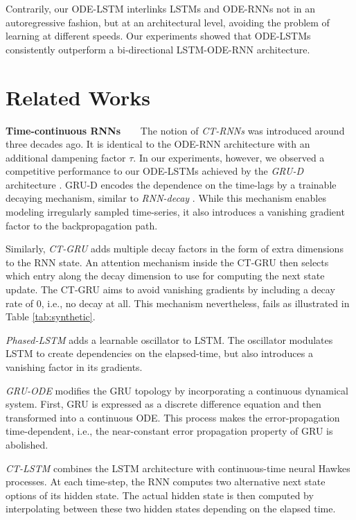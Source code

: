 \documentclass{article}
\begin{document}
Contrarily, our ODE-LSTM interlinks LSTMs and ODE-RNNs not in an autoregressive fashion, but at an architectural level, avoiding the problem of learning at different speeds. Our experiments showed that ODE-LSTMs consistently outperform a bi-directional LSTM-ODE-RNN architecture.

\section{Related Works}
\textbf{Time-continuous RNNs~~~} The notion of \textit{CT-RNNs} \cite{funahashi1993approximation} was introduced around three decades ago. It is identical to the ODE-RNN architecture \cite{rubanova2019latent} with an additional dampening factor $\tau$. In our experiments, however, we observed a competitive performance to our ODE-LSTMs achieved by the \textit{GRU-D} architecture \cite{che2018recurrent}. GRU-D encodes the dependence on the time-lags by a trainable decaying mechanism, similar to \textit{RNN-decay} \cite{rubanova2019latent}. While this mechanism enables modeling irregularly sampled time-series, it also introduces a vanishing gradient factor to the backpropagation path. 

Similarly, \textit{CT-GRU} \cite{mozer2017discrete} adds multiple decay factors in the form of extra dimensions to the RNN state. An attention mechanism inside the CT-GRU then selects which entry along the decay dimension to use for computing the next state update. The CT-GRU aims to avoid vanishing gradients by including a decay rate of 0, i.e., no decay at all. This mechanism nevertheless, fails as illustrated in Table \ref{tab:synthetic}. 

\textit{Phased-LSTM} \cite{neil2016phased} adds a learnable oscillator to LSTM. The oscillator modulates LSTM to create dependencies on the elapsed-time, but also introduces a vanishing factor in its gradients. 

\textit{GRU-ODE} \cite{de2019gru} modifies the GRU \cite{chung2014empirical} topology by incorporating a continuous dynamical system. First, GRU is expressed as a discrete difference equation and then transformed into a continuous ODE. This process makes the error-propagation time-dependent, i.e., the near-constant error propagation property of GRU is abolished. 


\textit{CT-LSTM} \cite{mei2017neural} combines the LSTM architecture with continuous-time neural Hawkes processes. At each time-step, the RNN computes two alternative next state options of its hidden state. The actual hidden state is then computed by interpolating between these two hidden states depending on the elapsed time.
\end{document}

